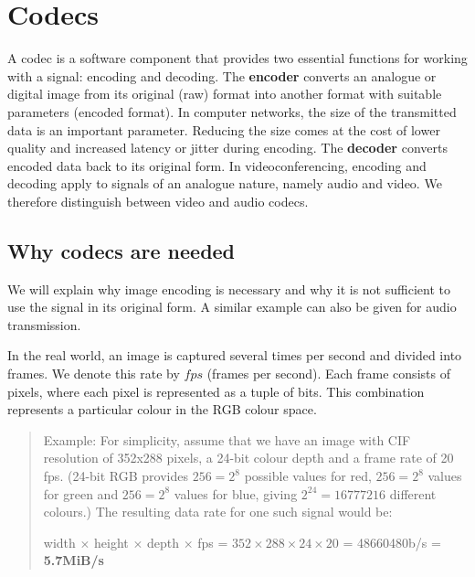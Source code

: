 \chapter{Codecs}

A codec is a software component that provides two essential functions for working with a signal: encoding and decoding. The \textbf{encoder} converts an analogue or digital image from its original (raw) format into another format with suitable parameters (encoded format). In computer networks, the size of the transmitted data is an important parameter. Reducing the size comes at the cost of lower quality and increased latency or jitter during encoding. The \textbf{decoder} converts encoded data back to its original form. In videoconferencing, encoding and decoding apply to signals of an analogue nature, namely audio and video. We therefore distinguish between video and audio codecs.

\section{Why codecs are needed}

We will explain why image encoding is necessary and why it is not sufficient to use the signal in its original form. A similar example can also be given for audio transmission.

In the real world, an image is captured several times per second and divided into frames. We denote this rate by $fps$ (frames per second). Each frame consists of pixels, where each pixel is represented as a tuple of bits. This combination represents a particular colour in the RGB colour space.

\begin{quote}
Example: For simplicity, assume that we have an image with CIF resolution of 352x288 pixels, a 24-bit colour depth and a frame rate of 20 fps. (24-bit RGB provides $256=2^8$ possible values for red, $256=2^8$ values for green and $256=2^8$ values for blue, giving $2^{24}=16777216$ different colours.) The resulting data rate for one such signal would be:

width $\times$ height $\times$ depth $\times$ fps =
$352\times288\times24\times20$ =
48660480b/s =
\textbf{5.7MiB/s}
\end{quote}

